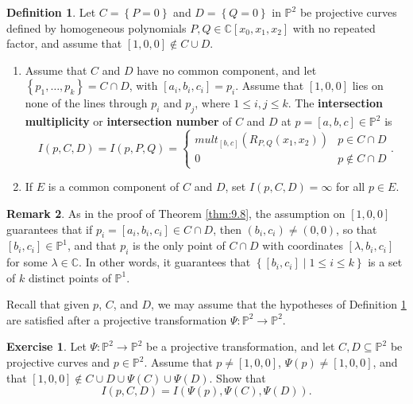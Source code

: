 \documentclass{article}
\newcommand{\C}{\mathbb{C}}
\renewcommand{\P}{\mathbb{P}}
\newcommand{\rb}[1]{\left( #1 \right)}
\renewcommand{\sb}[1]{\left[ #1 \right]}
\newcommand{\cb}[1]{\left\{ #1 \right\}}
\theoremstyle{definition}\newtheorem{definition}{Definition}[section]
\theoremstyle{definition}\newtheorem{notation}[definition]{Notation}
\theoremstyle{definition}\newtheorem{remark}[definition]{Remark}
\theoremstyle{definition}\newtheorem{example}[definition]{Example}
\theoremstyle{definition}\newtheorem{fact}{Fact}
\theoremstyle{definition}\newtheorem{exercise}{Exercise}
\begin{document}
\begin{definition}
\label{def:11.8}
Let $ C = \cb{P = 0} $ and $ D = \cb{Q = 0} $ in $ \P^2 $ be projective curves defined by homogeneous polynomials $ P, Q \in \C\sb{x_0, x_1, x_2} $ with no repeated factor, and assume that $ \sb{1, 0, 0} \notin C \cup D $.
\begin{enumerate}
\item Assume that $ C $ and $ D $ have no common component, and let $ \cb{p_1, \dots, p_k} = C \cap D $, with $ \sb{a_i, b_i, c_i} = p_i $. Assume that $ \sb{1, 0, 0} $ lies on none of the lines through $ p_i $ and $ p_j $, where $ 1 \le i, j \le k $. The \textbf{intersection multiplicity} or \textbf{intersection number} of $ C $ and $ D $ at $ p = \sb{a, b, c} \in \P^2 $ is
$$ I\rb{p, C, D} = I\rb{p, P, Q} = \begin{cases} mult_{\sb{b, c}}\rb{R_{P, Q}\rb{x_1, x_2}} & p \in C \cap D \\ 0 & p \notin C \cap D \end{cases}. $$
\item If $ E $ is a common component of $ C $ and $ D $, set $ I\rb{p, C, D} = \infty $ for all $ p \in E $.
\end{enumerate}
\end{definition}

\begin{remark}
As in the proof of Theorem \ref{thm:9.8}, the assumption on $ \sb{1, 0, 0} $ guarantees that if $ p_i = \sb{a_i, b_i, c_i} \in C \cap D $, then $ \rb{b_i, c_i} \ne \rb{0, 0} $, so that $ \sb{b_i, c_i} \in \P^1 $, and that $ p_i $ is the only point of $ C \cap D $ with coordinates $ \sb{\lambda, b_i, c_i} $ for some $ \lambda \in \C $. In other words, it guarantees that $ \cb{\sb{b_i, c_i} \mid 1 \le i \le k} $ is a set of $ k $ distinct points of $ \P^1 $.
\end{remark}

Recall that given $ p $, $ C $, and $ D $, we may assume that the hypotheses of Definition \ref{def:11.8} are satisfied after a projective transformation $ \Psi : \P^2 \to \P^2 $.

\begin{exercise}
Let $ \Psi : \P^2 \to \P^2 $ be a projective transformation, and let $ C, D \subseteq \P^2 $ be projective curves and $ p \in \P^2 $. Assume that $ p \ne \sb{1, 0, 0} $, $ \Psi\rb{p} \ne \sb{1, 0, 0} $, and that $ \sb{1, 0, 0} \notin C \cup D \cup \Psi\rb{C} \cup \Psi\rb{D} $. Show that
$$ I\rb{p, C, D} = I\rb{\Psi\rb{p}, \Psi\rb{C}, \Psi\rb{D}}. $$
\end{exercise}
\end{document}
